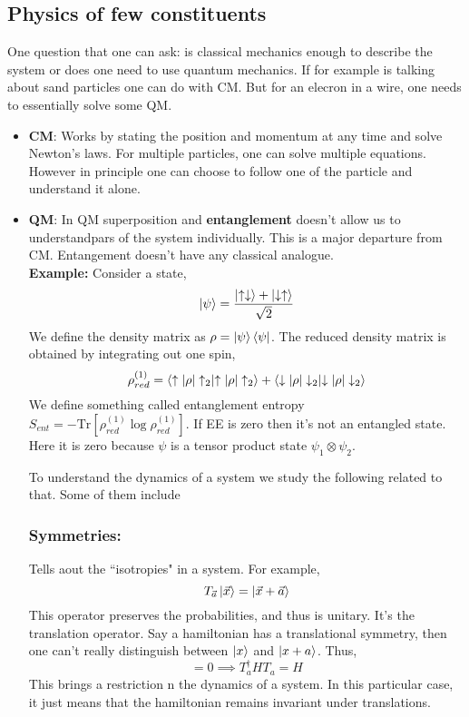 \documentclass[a4paper,11pt]{article}
\newcommand{\be}{\begin{equation}}
\newcommand{\ee}{\end{equation}}
\begin{document}
\subsection{Physics of few constituents}
One question that one can ask: is classical mechanics enough to describe the system or does one need to use quantum mechanics. If for example is talking about sand particles one can do with CM. But for an elecron in a wire, one needs to essentially solve some QM.
\begin{itemize}
	\item {\bf CM}: Works by stating the position and momentum at any time and solve Newton's laws. For multiple particles, one can solve multiple equations. However in principle one can choose to follow one of the particle and understand it alone. 
	
	\item {\bf QM}: In QM superposition and {\bf entanglement} doesn't allow us to understandpars of the system individually. This is a major departure from CM. Entangement doesn't have any classical analogue.\\
	{\bf Example:} Consider a state, 
	\be
	\ket{\psi} = \frac{\ket{\uparrow \downarrow} + \ket{ \downarrow \uparrow}}{\sqrt{2}}
	\ee
	We define the density matrix as $\rho = \ket{\psi} \bra{\psi}$. The reduced density matrix is obtained by integrating out one spin,
	\be
	\rho_{red}^{(1)} = \braket{\uparrow|\rho|\uparrow_2} + \braket{\downarrow|\rho|\downarrow_2}
	\ee
	We define something called entanglement entropy $S_{ent}=-\mbox{Tr}[\rho_{red}^{(1)} \log\rho_{red}^{(1)}  ]$. If EE is zero then it's not an entangled state. Here it is zero because $\psi$ is  a tensor product state $\psi_1 \otimes \psi_2$. 
	
	To understand the dynamics of a system we study the following related to that. Some of them include
	
	\subsubsection{Symmetries:} Tells aout the ``isotropies" in a system. For example,
	\be
	T_{\vec a}\ket{\vec x} = \ket{\vec x + \vec a}
	\ee
	This operator preserves the probabilities, and thus is unitary. It's the translation operator. Say a hamiltonian has a translational symmetry, then one can't really distinguish between $ \ket{x} $ and $ \ket{x + a} $. Thus,
	\begin{equation*}
	[H, T_{\vec a}] = 0 \implies T_a^{\dagger} H T_a = H
	\end{equation*}
	This brings a restriction n the dynamics of a system. In this particular case, it just means that the hamiltonian remains invariant under translations.	

\end{itemize}
\end{document}
